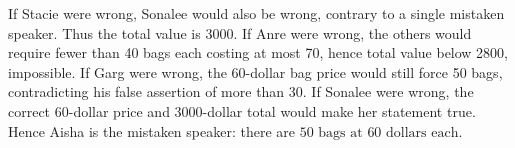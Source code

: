 If Stacie were wrong, Sonalee would also be wrong, contrary to a single mistaken speaker. Thus the total value is 3000. If Anre were wrong, the others would require fewer than 40 bags each costing at most 70, hence total value below 2800, impossible. If Garg were wrong, the 60-dollar bag price would still force 50 bags, contradicting his false assertion of more than 30. If Sonalee were wrong, the correct 60-dollar price and 3000-dollar total would make her statement true. Hence Aisha is the mistaken speaker: there are $\boxed{50\text{ bags at }60\text{ dollars each}}$.
